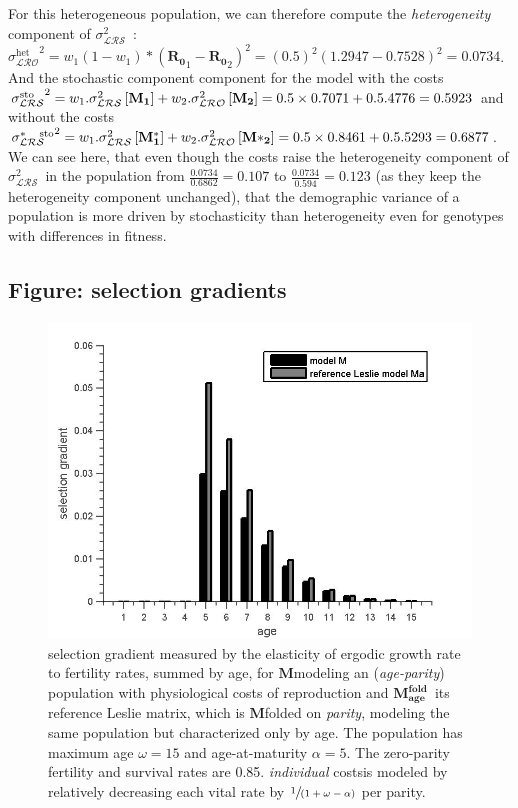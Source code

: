 \documentclass[10pt,a4paper]{article}
\newcommand{\M}{$\mathbf{M}$}
\newcommand{\PCoR}{\emph{individual} costs}
\newcommand{\Ma}{$\mathbf{M^{fold}_{age}}$}
\newcommand{\vLRO}{$\sigma_{\mathrm{\mathcal{LRS}}}^2$}
\begin{document}
{For this heterogeneous population, we can therefore compute the \emph{heterogeneity} component of \vLRO\ :${\sigma_{\mathcal{LRO}}^{\mathrm{het}}}^{2}=w_{1}(1-w_{1})*(\mathbf{R_0}_{1}-\mathbf{R_0}_{2})^{2}=(0.5)^{2}(1.2947-0.7528)^{2}=0.0734$.
And the stochastic component component for the model with the costs ${\sigma_{\mathcal{LRS}}^{\mathrm{sto}}}^{2}=w_{1}.\sigma^{2}_{\mathcal{LRS}}\left[ \mathbf{M_{1}}\right] + w_{2}.\sigma^{2}_{\mathcal{LRO}}\left[ \mathbf{M_{2}}\right]=0.5\times 0.7071  +0.5 \time 0.4776= 0.5923$ and without the costs 
${\sigma_{\mathcal{LRS}}^{\mathrm{*\quad sto}}}^{2}=w_{1}.\sigma^{2}_{\mathcal{LRS}}\left[ \mathbf{M^{*}_{1}}\right] + w_{2}.\sigma^{2}_{\mathcal{LRO}}\left[ \mathbf{M*_{2}}\right]=0.5\times 0.8461  +0.5 \time 0.5293= 0.6877$. We can see here, that even though the costs raise the heterogeneity component of \vLRO\ in the population from $\frac{0.0734}{0.6862}=0.107$ to $\frac{0.0734}{0.594}=0.123$ (as they keep the heterogeneity component unchanged), that the demographic variance of a population is more driven by stochasticity than heterogeneity even for genotypes with differences in fitness.



\subsection{Figure: selection gradients}
\begin{figure}[hbtp]%
\centering
\includegraphics[scale=.25]{selgrad1.jpg}
\caption{selection gradient measured by the elasticity of ergodic growth rate to fertility rates, summed by age, for \M modeling an (\emph{age-parity}) population with physiological costs of reproduction and \Ma\ its reference Leslie matrix, which is \M folded on \emph{parity}, modeling the same population but characterized only by age. The population has maximum age $\omega=15$ and age-at-maturity $\alpha=5$. The zero-parity fertility and survival rates are 0.85. \PCoR is modeled by relatively decreasing each vital rate by $\sfrac{1}{(1+\omega -\alpha)}$ per parity.}
\label{fig:selgrad1}
\end{figure}


}
\end{document}
